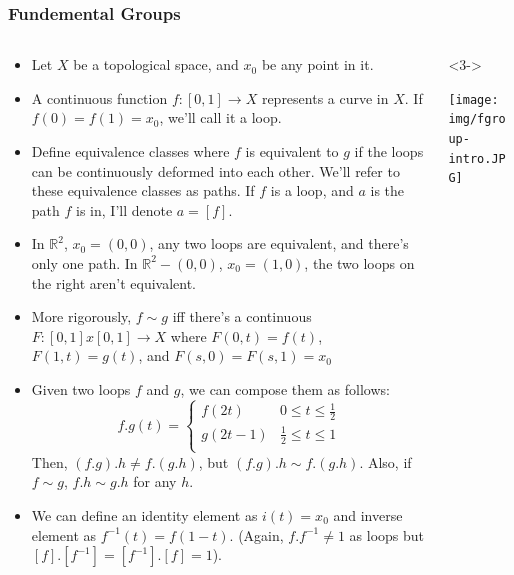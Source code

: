 \documentclass[8pt]{beamer}
\begin{document}
  \begin{frame}
    \frametitle{Fundemental Groups}
    \begin{columns}
      \begin{column}[T]{0.5\textwidth}
        \begin{itemize}
          \item<1-> Let $X$ be a topological space, and $x_0$ be any point in it.

          \item<2-> A continuous function $f:[0,1] \rightarrow X$ represents a curve
            in $X$. If $f(0) = f(1) = x_0$, we'll call it a loop.

          \item<4-> Define equivalence classes where $f$ is equivalent to $g$ if
            the loops can be continuously deformed into each other. We'll refer
            to these equivalence classes as paths. If $f$ is a loop, and $a$ is
            the path $f$ is in, I'll denote $a = [f]$.
          \item<5-> In $\mathbb{R}^2$, $x_0 = (0,0)$, any two loops are equivalent,
            and there's only one path.
            In $\mathbb{R}^2 - (0,0)$, $x_0 = (1,0)$, the two loops on the right
            aren't equivalent.
          \item<6-> More rigorously, $f \sim g  $ iff there's a continuous $F: [0,1]x
            [0,1] \rightarrow X$ where $F(0,t) = f(t)$, $F(1,t) = g(t)$, and
            $F(s,0) = F(s,1) = x_0$
          \item<7-> Given two loops $f$ and $g$, we can compose them as follows:
            \[f . g (t) = \begin{cases} f(2t) & 0 \leq t \leq \frac{1}{2} \\
                                        g(2t-1) & \frac{1}{2} \leq t \leq 1 \\
            \end{cases}\]
            Then, $(f.g).h \neq f.(g.h)$, but $(f.g).h \sim f.(g.h)$. Also, if
            $f \sim g$, $f . h \sim g . h$ for any  $h$.
          \item<8-> We can define an identity element as $i(t) = x_0$ and inverse
            element as $f^{-1}(t) = f(1-t)$. (Again, $f.f^{-1} \neq 1$ as loops
            but $[f].[f^{-1}] = [f^{-1}].[f] = 1$).
        \end{itemize}
      \end{column}
      \begin{column}[T]{0.5\textwidth}<3->
        \begin{center}
        \texttt{[image: img/fgroup-intro.JPG]}
        \end{center}
      \end{column}
    \end{columns}
  \end{frame}
\end{document}
